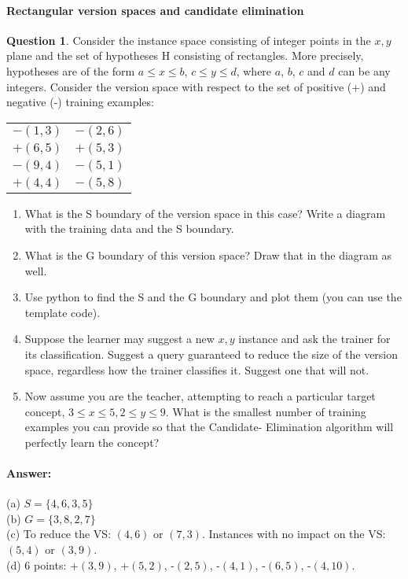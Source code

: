 \documentclass[11pt,a4paper]{article}
\theoremstyle{definition}%
\newtheorem{Q}{Question}[] %
\newcommand{\reponse}[1]{%
\ifthenelse {\boolean{corrige}} {\paragraph{Answer:} \color{darkblue}   #1\color{black}} {}
}
\begin{document}
\paragraph{Rectangular version spaces and candidate elimination}
\begin{Q}
    Consider the instance space consisting of integer points in the $x, y$ plane and the set of
hypotheses H consisting of rectangles. More precisely, hypotheses are of the form $a \leq x \leq b$,
$c \leq y \leq d$, where $a$, $b$, $c$ and $d$ can be any integers. Consider the version space with 
respect to the set of positive (+) and negative (-) training examples:

\begin{tabular}{ll}
$-(1,3)$ & $-(2,6)$ \\
$+(6,5)$ & $+(5,3)$ \\
$-(9,4)$ & $-(5,1)$ \\
$+(4,4)$ & $-(5,8)$
\end{tabular}

\begin{enumerate}
    \item What is the S boundary of the version space in this case? Write a diagram with the
        training data and the S boundary.
    \item What is the G boundary of this version space? Draw that in the diagram as well.
    \item Use python to find the S and the G boundary and plot them (you can use the template code).
    \item Suppose the learner may suggest a new $x, y$ instance and ask the trainer for its 
        classification. Suggest a query guaranteed to reduce the size of the version space, 
        regardless how the trainer classifies it. Suggest one that will not.
    \item Now assume you are the teacher, attempting to reach a particular target concept,
$3 \leq x \leq 5, 2 \leq y \leq 9$. What is the smallest number of training examples you can
provide so that the Candidate- Elimination algorithm will perfectly learn the concept?

\end{enumerate}

\reponse{
(a) $S = \{4,6,3,5\}$\\
(b) $G = \{3,8,2,7\}$\\
(c) To reduce the VS: $(4, 6)$ or $(7, 3)$. Instances with no impact on the VS: $(5, 4)$ or $(3, 9)$.\\
(d) 6 points: +$(3, 9)$, +$(5, 2)$, -$(2, 5)$, -$(4, 1)$, -$(6, 5)$, -$(4, 10)$.
}

\end{Q}
\end{document}
